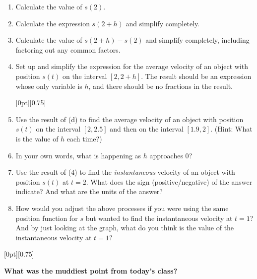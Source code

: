 \documentclass[11pt]{article}
\newcommand{\cuthere}{%
\noindent
\raisebox{-2.8pt}[0pt][0.75\baselineskip]{\small\ding{34}}
\unskip{\tiny\dotfill}
}
\begin{document}
\begin{enumerate}
			\item Calculate the value of $s(2)$. 
			
			\vspace{0.5in}
			
			\item Calculate the expression $s(2+h)$ and simplify completely. 
			
			\vspace{1.3in}
			
			
			\item Calculate the value of $s(2+h) - s(2)$ and simplify completely, including factoring out any common factors. 
			
			\vspace{1.3in}
			
			\item Set up and simplify the expression for the average velocity of an object with position $s(t)$ on the interval $[2, 2+h]$. The result should be an expression whose only variable is $h$, and there should be no fractions in the result. 
			
\vfill 
\cuthere
\vspace*{1in}
			
\newpage
			
			\item Use the result of (d) to find the average velocity of an object with position $s(t)$ on the interval $[2, 2.5]$ and then on the interval $[1.9, 2]$. (Hint: What is the value of $h$ each time?)
			
			\vspace{1.5in}
			
			\item In your own words, what is happening as $h$ approaches $0$? 
			 
			
			\vspace{1in}
			
			\item Use the result of (4) to find the \emph{instantaneous} velocity of an object with position $s(t)$ at $t = 2$. What does the sign (positive/negative) of the answer indicate? And what are the units of the answer? 
	
	
		\vspace{1.5in}
		
		\item How would you adjust the above processes if you were using the same position function for $s$ but wanted to find the instantaneous velocity at $t = 1$? And by just looking at the graph, what do you think is the value of the instantaneous velocity at $t=1$? 
	
	
	
\end{enumerate}

\vfill

\cuthere

\noindent
\textbf{What was the muddiest point from today's class?}

\vspace{1in}
\end{document}
